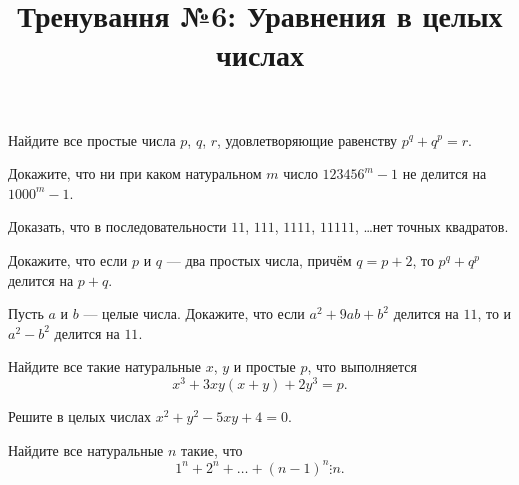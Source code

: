 


\title{Тренування №6: Уравнения в целых числах}
\maketitle
\begin{problem}
	Найдите все простые числа $p$, $q$, $r$, удовлетворяющие равенству $p^q + q^p = r$.
\end{problem}

\begin{problem}
	Докажите, что ни при каком натуральном $m$ число $123456^m - 1$ не делится на $1000^m - 1$.
\end{problem}

\begin{problem}
	Доказать, что в последовательности $11$, $111$, $1111$, $11111$, \dots нет точных квадратов.
\end{problem}

\begin{problem}
	Докажите, что если $p$ и $q$ --- два простых числа, причём $q = p + 2$, то $p^q + q^p$ делится на $p + q$.
\end{problem}

\begin{problem}
	Пусть $a$ и $b$ --- целые числа. Докажите, что если $a^2 + 9ab + b^2$ делится на $11$, то и $a^2 - b^2$ делится на $11$.
\end{problem}

\begin{problem}
	Найдите все такие натуральные $x$, $y$ и простые $p$, что выполняется
\begin{equation}
  x^3 + 3xy(x + y) + 2y^3 = p.
\end{equation}
\end{problem}

\begin{problem}
	Решите в целых числах $x^2 + y^2 - 5xy + 4 = 0$.
\end{problem}

\begin{problem}
	Найдите все натуральные $n$ такие, что
\begin{equation}
  1^n + 2^n + \ldots + (n - 1)^n \vdots n.
\end{equation}
\end{problem}

